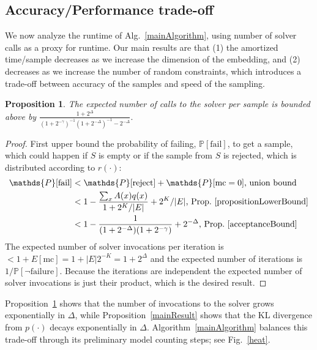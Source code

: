 \documentclass{article}
\newcommand{\Probability}{\mathds{P}} %
\newtheorem{proposition}{Proposition}
\begin{document}
  

  \subsection{Accuracy/Performance trade-off}
  We now analyze the runtime of Alg.~\ref{mainAlgorithm},
  using number of solver calls as a proxy for runtime.
  Our main results are that (1) the amortized time/sample decreases as we increase the dimension of the embedding,
  and (2) decreases as we increase the number of random constraints,
  which introduces a trade-off between accuracy of the samples and speed of the sampling.

  \begin{proposition}\label{proposition:tt}
    The expected number of calls to the solver per sample is bounded above by $\frac{1 + 2^\Delta}{(1 + 2^{ - \gamma})^{-1}(1 + 2^{ - \Delta})^{-1} - 2^{ - \Delta}}.$
  \end{proposition}
  \begin{proof}
    First upper bound the probability of failing, $\Probability [\text{fail}]$, to get a sample,
    which could happen if $S$  is empty or if the sample from $S$ is rejected,
    which is distributed according to $r(\cdot )$:
    \begin{align}
      \Probability [\text{fail}]& < \Probability [\text{reject}] + \Probability [\text{mc} = 0] \text{, union bound}\\
      & < 1 - \frac{\sum_x A(x)q(x)}{1 + 2^K/|E|} + 2^K/|E| \text{, Prop.~\ref{propositionLowerBound}}\\
      & < 1 - \frac{1}{(1 + 2^{ - \Delta})(1 + 2^{ - \gamma})} + 2^{ - \Delta}\text{, Prop.~\ref{acceptanceBound}}
    \end{align}
    The expected number of solver invocations per iteration is $< 1+E[\text{mc}] = 1 + |E|2^{-K} = 1 + 2^{\Delta}$
    and the expected number of iterations is $1/\Probability [\neg\text{failure}] $.
    Because the iterations are independent the expected number of solver invocations is just their product, which is the desired result.
  \end{proof}
  Proposition~\ref{proposition:tt} shows that the number of invocations to the solver grows exponentially in $\Delta$, while Proposition~\ref{mainResult} shows that the KL divergence from $p(\cdot )$ decays exponentially in $\Delta$.
  Algorithm~\ref{mainAlgorithm} balances this trade-off through its preliminary model counting steps; see Fig.~\ref{heat}.
\end{document}
